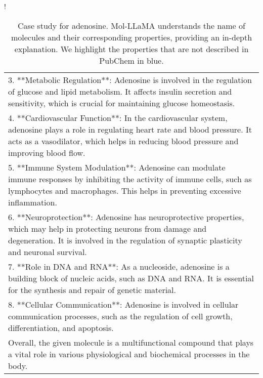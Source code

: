 \begin{table*}[ht!]
\begin{resizebox}{\linewidth}{!}
{\begin{tabular}{l c}
\multicolumn{2}{p{22cm}}{3. **Metabolic Regulation**: Adenosine is involved in the regulation of glucose and lipid metabolism. \textcolor{tabblue}{It affects insulin secretion and sensitivity, which is crucial for maintaining glucose homeostasis.}}\\

\multicolumn{2}{p{22cm}}{4. **Cardiovascular Function**: In the cardiovascular system, adenosine plays a role in regulating heart rate and blood pressure. It acts as a vasodilator, which helps in reducing blood pressure and improving blood flow.}\\

\multicolumn{2}{p{22cm}}{5. **Immune System Modulation**: \textcolor{tabblue}{Adenosine can modulate immune responses by inhibiting the activity of immune cells, such as lymphocytes and macrophages.} This helps in preventing excessive inflammation.}\\

\multicolumn{2}{p{22cm}}{6. **Neuroprotection**: \textcolor{tabblue}{Adenosine has neuroprotective properties, which may help in protecting neurons from damage and degeneration.} It is involved in the regulation of synaptic plasticity and neuronal survival.}\\

\multicolumn{2}{p{22cm}}{7. **Role in DNA and RNA**: As a nucleoside, adenosine is a building block of nucleic acids, such as DNA and RNA. It is essential for the synthesis and repair of genetic material.}\\

\multicolumn{2}{p{22cm}}{8. **Cellular Communication**: Adenosine is involved in cellular communication processes, such as the regulation of cell growth, differentiation, and apoptosis.}\\

\multicolumn{2}{p{22cm}}{Overall, the given molecule is a multifunctional compound that plays a vital role in various physiological and biochemical processes in the body.}\\
\bottomrule
\end{tabular}}
\end{resizebox}
\vspace{-0.1in}
\caption{Case study for adenosine. Mol-LLaMA understands the name of molecules and their corresponding properties, providing an in-depth explanation. We highlight the properties that are not described in PubChem in \textcolor{tabblue}{blue}.}
\label{app:tab:additional_qualitative_adenosine}
\vspace{-0.1in}
\end{table*}